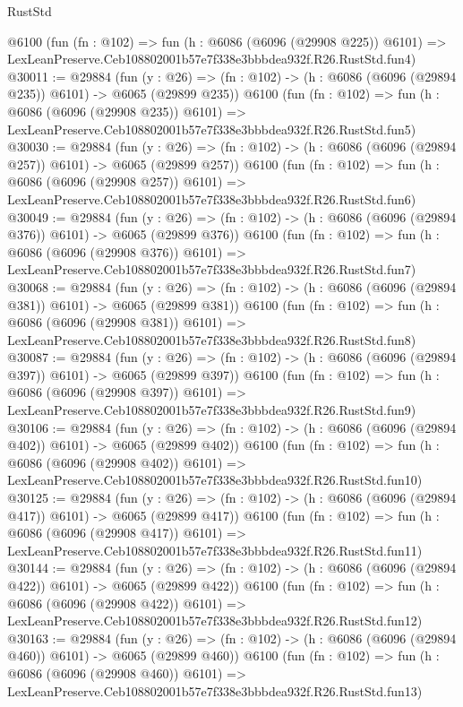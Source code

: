 \begin{lexlean}{RustStd}
\begin{coremodule}
    @6100
    (fun (fn : @102) =>
    fun (h : @6086 (@6096 (@29908 @225)) @6101) =>
    LexLeanPreserve.Ceb108802001b57e7f338e3bbbdea932f.R26.RustStd.fun4)
@30011 := @29884
    (fun (y : @26) => (fn : @102) -> (h : @6086 (@6096 (@29894 @235)) @6101) -> @6065 (@29899 @235))
    @6100
    (fun (fn : @102) =>
    fun (h : @6086 (@6096 (@29908 @235)) @6101) =>
    LexLeanPreserve.Ceb108802001b57e7f338e3bbbdea932f.R26.RustStd.fun5)
@30030 := @29884
    (fun (y : @26) => (fn : @102) -> (h : @6086 (@6096 (@29894 @257)) @6101) -> @6065 (@29899 @257))
    @6100
    (fun (fn : @102) =>
    fun (h : @6086 (@6096 (@29908 @257)) @6101) =>
    LexLeanPreserve.Ceb108802001b57e7f338e3bbbdea932f.R26.RustStd.fun6)
@30049 := @29884
    (fun (y : @26) => (fn : @102) -> (h : @6086 (@6096 (@29894 @376)) @6101) -> @6065 (@29899 @376))
    @6100
    (fun (fn : @102) =>
    fun (h : @6086 (@6096 (@29908 @376)) @6101) =>
    LexLeanPreserve.Ceb108802001b57e7f338e3bbbdea932f.R26.RustStd.fun7)
@30068 := @29884
    (fun (y : @26) => (fn : @102) -> (h : @6086 (@6096 (@29894 @381)) @6101) -> @6065 (@29899 @381))
    @6100
    (fun (fn : @102) =>
    fun (h : @6086 (@6096 (@29908 @381)) @6101) =>
    LexLeanPreserve.Ceb108802001b57e7f338e3bbbdea932f.R26.RustStd.fun8)
@30087 := @29884
    (fun (y : @26) => (fn : @102) -> (h : @6086 (@6096 (@29894 @397)) @6101) -> @6065 (@29899 @397))
    @6100
    (fun (fn : @102) =>
    fun (h : @6086 (@6096 (@29908 @397)) @6101) =>
    LexLeanPreserve.Ceb108802001b57e7f338e3bbbdea932f.R26.RustStd.fun9)
@30106 := @29884
    (fun (y : @26) => (fn : @102) -> (h : @6086 (@6096 (@29894 @402)) @6101) -> @6065 (@29899 @402))
    @6100
    (fun (fn : @102) =>
    fun (h : @6086 (@6096 (@29908 @402)) @6101) =>
    LexLeanPreserve.Ceb108802001b57e7f338e3bbbdea932f.R26.RustStd.fun10)
@30125 := @29884
    (fun (y : @26) => (fn : @102) -> (h : @6086 (@6096 (@29894 @417)) @6101) -> @6065 (@29899 @417))
    @6100
    (fun (fn : @102) =>
    fun (h : @6086 (@6096 (@29908 @417)) @6101) =>
    LexLeanPreserve.Ceb108802001b57e7f338e3bbbdea932f.R26.RustStd.fun11)
@30144 := @29884
    (fun (y : @26) => (fn : @102) -> (h : @6086 (@6096 (@29894 @422)) @6101) -> @6065 (@29899 @422))
    @6100
    (fun (fn : @102) =>
    fun (h : @6086 (@6096 (@29908 @422)) @6101) =>
    LexLeanPreserve.Ceb108802001b57e7f338e3bbbdea932f.R26.RustStd.fun12)
@30163 := @29884
    (fun (y : @26) => (fn : @102) -> (h : @6086 (@6096 (@29894 @460)) @6101) -> @6065 (@29899 @460))
    @6100
    (fun (fn : @102) =>
    fun (h : @6086 (@6096 (@29908 @460)) @6101) =>
    LexLeanPreserve.Ceb108802001b57e7f338e3bbbdea932f.R26.RustStd.fun13)

\end{coremodule}
\end{lexlean}
